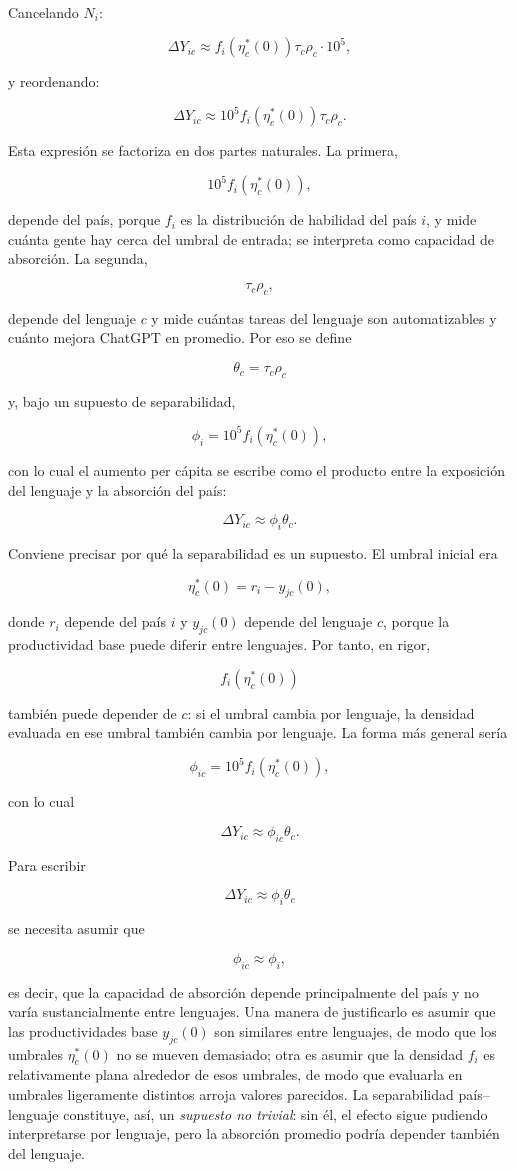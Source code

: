 \documentclass[12pt,a4paper]{article}
\begin{document}
Cancelando $N_i$:

\[
\Delta Y_{ic}
\approx
f_i(\eta_c^*(0))\tau_c\rho_c\cdot 10^5,
\]

y reordenando:

\[
\Delta Y_{ic}
\approx
10^5 f_i(\eta_c^*(0))\tau_c\rho_c.
\]

Esta expresión se factoriza en dos partes naturales. La primera,

\[
10^5 f_i(\eta_c^*(0)),
\]

depende del país, porque $f_i$ es la distribución de habilidad del país $i$, y mide cuánta gente hay cerca del umbral de entrada; se interpreta como capacidad de absorción. La segunda,

\[
\tau_c\rho_c,
\]

depende del lenguaje $c$ y mide cuántas tareas del lenguaje son automatizables y cuánto mejora ChatGPT en promedio. Por eso se define

\[
\theta_c=\tau_c\rho_c
\]

y, bajo un supuesto de separabilidad,

\[
\phi_i=10^5 f_i(\eta_c^*(0)),
\]

con lo cual el aumento per cápita se escribe como el producto entre la exposición del lenguaje y la absorción del país:

\[
\Delta Y_{ic}\approx \phi_i\theta_c.
\]

Conviene precisar por qué la separabilidad es un supuesto. El umbral inicial era

\[
\eta_c^*(0)=r_i-y_{jc}(0),
\]

donde $r_i$ depende del país $i$ y $y_{jc}(0)$ depende del lenguaje $c$, porque la productividad base puede diferir entre lenguajes. Por tanto, en rigor,

\[
f_i(\eta_c^*(0))
\]

también puede depender de $c$: si el umbral cambia por lenguaje, la densidad evaluada en ese umbral también cambia por lenguaje. La forma más general sería

\[
\phi_{ic}=10^5 f_i(\eta_c^*(0)),
\]

con lo cual

\[
\Delta Y_{ic}\approx \phi_{ic}\theta_c.
\]

Para escribir

\[
\Delta Y_{ic}\approx \phi_i\theta_c
\]

se necesita asumir que

\[
\phi_{ic}\approx \phi_i,
\]

es decir, que la capacidad de absorción depende principalmente del país y no varía sustancialmente entre lenguajes. Una manera de justificarlo es asumir que las productividades base $y_{jc}(0)$ son similares entre lenguajes, de modo que los umbrales $\eta_c^*(0)$ no se mueven demasiado; otra es asumir que la densidad $f_i$ es relativamente plana alrededor de esos umbrales, de modo que evaluarla en umbrales ligeramente distintos arroja valores parecidos. La separabilidad país--lenguaje constituye, así, un \textit{supuesto no trivial}: sin él, el efecto sigue pudiendo interpretarse por lenguaje, pero la absorción promedio podría depender también del lenguaje.
\end{document}
